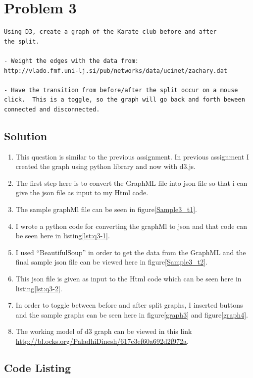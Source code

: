 \section{Problem 3}
\label{part3}
\begin{verbatim}
Using D3, create a graph of the Karate club before and after
the split.

- Weight the edges with the data from: 
http://vlado.fmf.uni-lj.si/pub/networks/data/ucinet/zachary.dat

- Have the transition from before/after the split occur on a mouse
click.  This is a toggle, so the graph will go back and forth beween
connected and disconnected.
\end{verbatim}
\subsection{Solution}
\begin{enumerate}

\item This question is similar to the previous assignment. In previous assignment I created the graph using python library and now with d3.js.
\item The first step here is to convert the GraphML file into json file so that i can give the json file as input to my Html code.
\item The sample graphMl file can be seen in figure\ref{Sample3_t1}.
\item I wrote a python code for converting the graphMl to json and that code can be seen here in listing\ref{lst:q3-1}.
\item I used ``BeautifulSoup'' in order to get the data from the GraphML and the final sample json file can be viewed here in figure\ref{Sample3_t2}.
\item This json file is given as input to the Html code which can be seen here in listing\ref{lst:q3-2}.
\item In order to toggle between before and after split graphs, I inserted buttons and the sample graphs can be seen here in figure\ref{graph3} and figure\ref{graph4}.
\item The working model of d3 graph can be viewed in this link \url{http://bl.ocks.org/PaladhiDinesh/617c3ef60a692d2f972a}.

\newpage
\end{enumerate}
\subsection{Code Listing}


